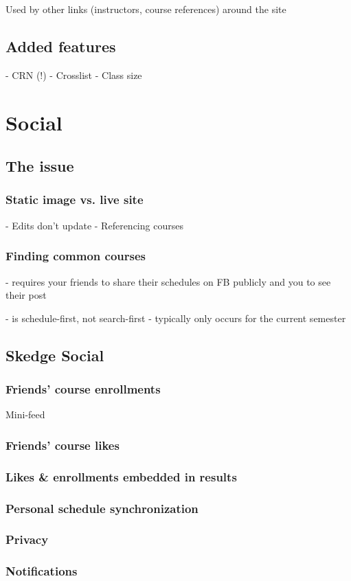 Used by other links (instructors, course references) around the site

\subsection{Added features}

- CRN (!)
- Crosslist
- Class size


\section{Social}

\subsection{The issue}

  \subsubsection{Static image vs. live site}

  - Edits don’t update
  - Referencing courses

  \subsubsection{Finding common courses}

  - requires your friends to share their schedules on FB publicly and you to see their post




  - is schedule-first, not search-first
  - typically only occurs for the current semester


\subsection{Skedge Social}


  \subsubsection{Friends' course enrollments}

  Mini-feed

  \subsubsection{Friends' course likes}

  \subsubsection{Likes \& enrollments embedded in results}

  \subsubsection{Personal schedule synchronization}

  \subsubsection{Privacy}

  \subsubsection{Notifications}

